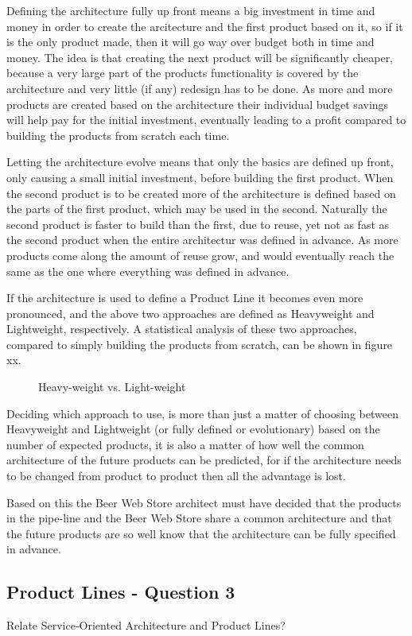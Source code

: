 Defining the architecture fully up front means a big investment in time and money in order to create the arcitecture and the first product based on it, so if it is the only product made, then it will go way over budget both in time and money. The idea is that creating the next product will be significantly cheaper, because a very large part of the products functionality is covered by the architecture and very little (if any) redesign has to be done. As more and more products are created based on the architecture their individual budget savings will help pay for the initial investment, eventually leading to a profit compared to building the products from scratch each time.

Letting the architecture evolve means that only the basics are defined up front, only causing a small initial investment, before building the first product. When the second product is to be created more of the architecture is defined based on the parts of the first product, which may be used in the second. Naturally the second product is faster to build than the first, due to reuse, yet not as fast as the second product when the entire architectur was defined in advance. As more products come along the amount of reuse grow, and would eventually reach the same as the one where everything was defined in advance.

If the architecture is used to define a Product Line it becomes even more pronounced, and the above two approaches are defined as Heavyweight and Lightweight, respectively. A statistical analysis of these two approaches, compared to simply building the products from scratch, can be shown in figure xx.

\clearpage

\begin{figure}[!htb]
\centerline{}
\caption{Heavy-weight vs. Light-weight}
\label{fig:product-line}
\end{figure}

Deciding which approach to use, is more than just a matter of choosing between Heavyweight and Lightweight (or fully defined or evolutionary) based on the number of expected products, it is also a matter of how well the common architecture of the future products can be predicted, for if the architecture needs to be changed from product to product then all the advantage is lost.

Based on this the Beer Web Store architect must have decided that the products in the pipe-line and the Beer Web Store share a common architecture and that the future products are so well know that the architecture can be fully specified in advance.

\subsection{Product Lines - Question 3}

\begin{question}
Relate Service-Oriented Architecture and Product Lines?
\end{question}


